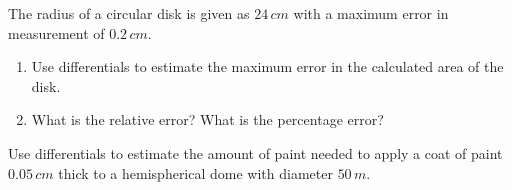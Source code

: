 \documentclass[answers]{exam}
\begin{document}
\begin{ex*}
  The radius of a circular disk is given as $24\,cm$ with a maximum error in measurement of $0.2\,cm$.
\end{ex*}
\begin{enumerate}[label=\alph*), itemsep=\stretch{1}]
  \item Use differentials to estimate the maximum error in the calculated area of the disk.
  \item What is the relative error? What is the percentage error?
\end{enumerate}
\pagebreak

\begin{ex*}
  Use differentials to estimate the amount of paint needed to apply a coat of paint $0.05\,cm$ thick to a hemispherical dome with diameter $50\,m$.
\end{ex*}
\pagebreak
\end{document}

